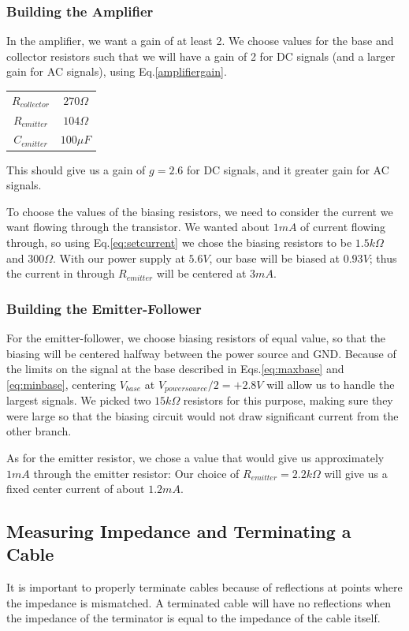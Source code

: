 \documentclass[12pt]{article}
\begin{document}
\subsubsection*{Building the Amplifier}
In the amplifier, we want a gain of at least 2. We choose values for the base and collector resistors such that we will have a gain of 2 for DC signals (and a larger gain for AC signals), using Eq.\ref{amplifiergain}. 
\begin{center}
  \begin{tabular}{ c  c }
    $R_{collector}$ & $270\Omega$ \\
    $R_{emitter}$ & $104\Omega$  \\
    $C_{emitter}$ & $100\mu F$\\
  \end{tabular}
\end{center}
This should give us a gain of $g=2.6$ for DC signals, and it greater gain for AC signals.

To choose the values of the biasing resistors, we need to consider the current we want flowing through the transistor. We wanted about $1mA$ of current flowing through, so using Eq.\ref{eq:setcurrent} we chose the biasing resistors to be $1.5k\Omega$ and $300\Omega$. With our power supply at $5.6V$, our base will be biased at $0.93V$; thus the current in through $R_{emitter}$ will be centered at $3mA$.

\subsubsection*{Building the Emitter-Follower}
For the emitter-follower, we choose biasing resistors of equal value, so that the biasing will be centered halfway between the power source and GND. Because of the limits on the signal at the base described in Eqs.\ref{eq:maxbase} and \ref{eq:minbase}, centering $V_{base}$ at $V_{powersource}/2=+2.8V$ will allow us to handle the largest signals. We picked two $15k\Omega$ resistors for this purpose, making sure they were large so that the biasing circuit would not draw significant current from the other branch.

As for the emitter resistor, we chose a value that would give us approximately $1mA$ through the emitter resistor: Our choice of $R_{emitter}=2.2k\Omega$ will give us a fixed center current of about $1.2mA$.

\subsection*{Measuring Impedance and Terminating a Cable}
It is important to properly terminate cables because of reflections at points where the impedance is mismatched. A terminated cable will have no reflections when the impedance of the terminator is equal to the impedance of the cable itself.
\end{document}
